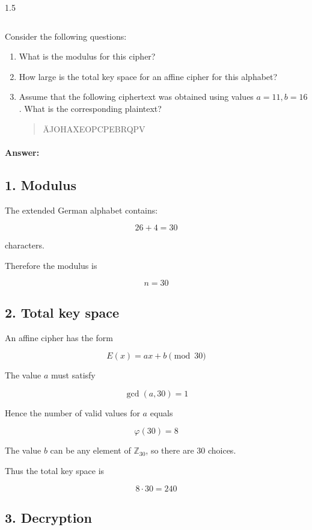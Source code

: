 \documentclass[]{scrartcl}
\newcounter{exercise}
\begin{document}
\begin{exercisebox}{1.5}
\begin{longtable}{|c|c|}
\end{longtable}
Consider the following questions:
\begin{enumerate}
    \item What is the modulus for this cipher?
    \item How large is the total key space for an affine cipher for this alphabet?
    \item Assume that the following ciphertext was obtained using values $a=11, b=16$. What is the corresponding plaintext?
    \begin{quote}
        ÄJOHAXEOPCPEBRQPV
    \end{quote}
\end{enumerate}
\end{exercisebox}

\paragraph{Answer:} {

\subsection*{1. Modulus}

The extended German alphabet contains:

\[
26+4=30
\]

characters.

Therefore the modulus is

\[
n=30
\]



\subsection*{2. Total key space}

An affine cipher has the form

\[
E(x)=ax+b \pmod{30}
\]

The value \(a\) must satisfy

\[
\gcd(a,30)=1
\]

Hence the number of valid values for \(a\) equals

\[
\varphi(30)=8
\]

The value \(b\) can be any element of \(\mathbb{Z}_{30}\), so there are 30 choices.

Thus the total key space is

\[
8\cdot30=240
\]



\subsection*{3. Decryption}

}
\end{document}
